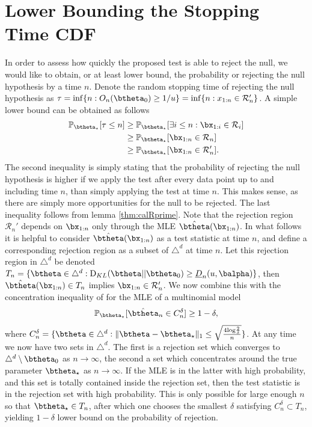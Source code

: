 \documentclass[11pt]{article}
\def\log{{\rm log}}
\newcommand{\KL}{\mathrm{D}_{KL}}
\begin{document}
\section{Lower Bounding the Stopping Time CDF}
\label{app:finite_sample}
In order to assess how quickly the proposed test is able to reject the null, we would like to obtain, or at least lower bound, the probability
or rejecting the null hypothesis by a time $n$. Denote the random stopping time of rejecting the null hypothesis as $\tau = \inf \{n : O_n(\btheta_0) \geq 1/u\} =\inf \{n : x_{1:n} \in \mathcal{R}'_n\}$. 
A simple lower bound can be obtained as follows
\begin{align*}
  \mathbb{P}_{\btheta_\star}[\tau \leq n] &\geq \mathbb{P}_{\btheta_\star}[\exists i \leq n : \bx_{1:i} \in \mathcal{R}_i]\\ 
&\geq \mathbb{P}_{\btheta_\star}[\bx_{1:n} \in \mathcal{R}_n]\\ 
&\geq \mathbb{P}_{\btheta_\star}[\bx_{1:n} \in \mathcal{R}'_n].\\ 
\end{align*}
The second inequality is simply stating that the probability of rejecting the null hypothesis is higher if
we apply the test after every data point up to and including time $n$, than simply applying the test at time $n$.
This makes sense, as there are simply more opportunities for the null to be rejected. 
The last inequality follows from lemma \ref{thm:calRprime}.
Note that the rejection region $\mathcal{R}_n'$ depends on $\bx_{1:n}$ only through the MLE $\hat{\btheta}(\bx_{1:n})$.
In what follows it is helpful to consider $\hat{\btheta}(\bx_{1:n})$ as a test statistic at time $n$,
and define a corresponding rejection region as a subset of $\triangle^d$ at time $n$.
Let this rejection region in $\triangle^d$ be denoted $T_n = \{\btheta \in \triangle^d : \KL(\btheta||\btheta_0) \geq \underline{D}_n(u,\balpha)\}$, then $\hat{\btheta}(\bx_{1:n})\in T_n$ implies
$\bx_{1:n} \in \mathcal{R}'_n$.
We now combine this with the concentration inequality of \cite{weissman2003inequalities} for the MLE of a multinomial model
\begin{align*}
  \mathbb{P}_{\btheta_\star}[\hat{\btheta}_n \in C_n^\delta] \geq 1 - \delta,
\end{align*}
where $C_n^\delta = \{ \btheta \in \triangle^d : \|\btheta-\btheta_\star\|_1 \leq \sqrt{\frac{4\log \frac{2}{\delta}}{n}}\}$.
At any time we now have two sets in $\triangle^d$. 
The first is a rejection set which converges to  $\triangle^d \setminus \btheta_0$ as $n \rightarrow \infty$,
the second a set which concentrates around the true parameter $\btheta_\star$ as $n \rightarrow \infty$.
If the MLE is in the latter with high probability, and this set is totally contained inside the rejection set, then the test statistic is in the rejection set with high probability. 
This is only possible for large enough $n$ so that $\btheta_\star \in T_n$, after which one chooses the smallest $\delta$ satisfying $C_n^\delta \subset T_n$, yielding $1-\delta$ lower bound on the probability of rejection.
\end{document}
